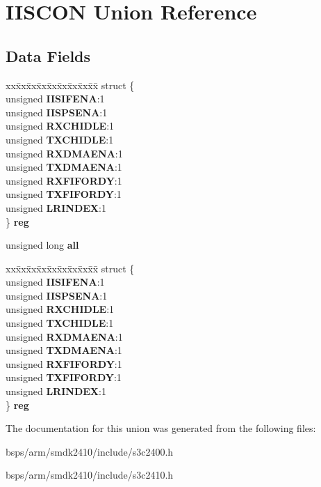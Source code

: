 \hypertarget{unionIISCON}{}\section{I\+I\+S\+C\+ON Union Reference}
\label{unionIISCON}
\subsection*{Data Fields}
\begin{DoxyCompactItemize}
\item 
\mbox{\label{unionIISCON_a4e32c1d91939e7f5aa186f80d08210ea}} 
\begin{tabbing}
xx\=xx\=xx\=xx\=xx\=xx\=xx\=xx\=xx\=\kill
struct \{\\
\>unsigned {\bfseries IISIFENA}:1\\
\>unsigned {\bfseries IISPSENA}:1\\
\>unsigned {\bfseries RXCHIDLE}:1\\
\>unsigned {\bfseries TXCHIDLE}:1\\
\>unsigned {\bfseries RXDMAENA}:1\\
\>unsigned {\bfseries TXDMAENA}:1\\
\>unsigned {\bfseries RXFIFORDY}:1\\
\>unsigned {\bfseries TXFIFORDY}:1\\
\>unsigned {\bfseries LRINDEX}:1\\
\} {\bfseries reg}\\

\end{tabbing}\item 
\mbox{\label{unionIISCON_a4b5f8ea1d487f4a94045e25a570ee911}} 
unsigned long {\bfseries all}
\item 
\mbox{\label{unionIISCON_aa87ce96104bfd7a3eeb0caf7f36ddfcf}} 
\begin{tabbing}
xx\=xx\=xx\=xx\=xx\=xx\=xx\=xx\=xx\=\kill
struct \{\\
\>unsigned {\bfseries IISIFENA}:1\\
\>unsigned {\bfseries IISPSENA}:1\\
\>unsigned {\bfseries RXCHIDLE}:1\\
\>unsigned {\bfseries TXCHIDLE}:1\\
\>unsigned {\bfseries RXDMAENA}:1\\
\>unsigned {\bfseries TXDMAENA}:1\\
\>unsigned {\bfseries RXFIFORDY}:1\\
\>unsigned {\bfseries TXFIFORDY}:1\\
\>unsigned {\bfseries LRINDEX}:1\\
\} {\bfseries reg}\\

\end{tabbing}\end{DoxyCompactItemize}


The documentation for this union was generated from the following files\+:\begin{DoxyCompactItemize}
\item 
bsps/arm/smdk2410/include/s3c2400.\+h\item 
bsps/arm/smdk2410/include/s3c2410.\+h\end{DoxyCompactItemize}

